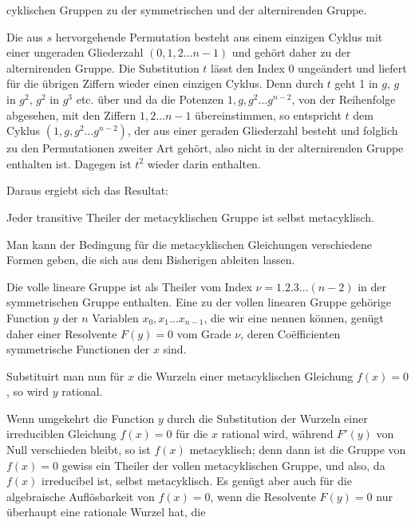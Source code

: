 cyklischen Gruppen zu der symmetrischen und der alternirenden Gruppe.

Die aus $s$ hervorgehende Permutation besteht aus einem einzigen Cyklus mit einer ungeraden Gliederzahl $(0, 1, 2 \ldots n-1)$ und gehört daher zu der alternirenden Gruppe. Die Substitution $t$ lässt den Index 0 ungeändert und liefert für die übrigen Ziffern wieder einen einzigen Cyklus. Denn durch $t$ geht 1 in $g$, $g$ in $g^2$, $g^2$ in $g^3$ etc. über und da die Potenzen $1, g, g^2 \ldots g^{n-2}$, von der Reihenfolge abgesehen, mit den Ziffern $1, 2 \ldots n-1$ übereinstimmen, so entspricht $t$ dem Cyklus $(1, g, g^2 \ldots g^{n-2})$, der aus einer geraden Gliederzahl besteht und folglich zu den Permutationen zweiter Art gehört, also nicht in der alternirenden Gruppe enthalten ist. Dagegen ist $t^2$ wieder darin enthalten.

Daraus ergiebt sich das Resultat:


Jeder transitive Theiler der metacyklischen Gruppe ist selbst metacyklisch.

Man kann der Bedingung für die metacyklischen Gleichungen verschiedene Formen geben, die sich aus dem Bisherigen ableiten lassen.

Die volle lineare Gruppe ist als Theiler vom Index $\nu = 1 . 2 . 3 \ldots (n-2)$ in der symmetrischen Gruppe enthalten. Eine zu der vollen linearen Gruppe gehörige Function $y$ der $n$ Variablen $x_0, x_1 \ldots x_{n-1}$, die wir eine  nennen können, genügt daher einer Resolvente $F(y)=0$ vom Grade $\nu$, deren Coëfficienten symmetrische Functionen der $x$ sind.

Substituirt man nun für $x$ die Wurzeln einer metacyklischen Gleichung $f(x)=0$, so wird $y$ rational.

Wenn umgekehrt die Function $y$ durch die Substitution der Wurzeln einer irreduciblen Gleichung $f(x)=0$ für die $x$ rational wird, während $F'(y)$ von Null verschieden bleibt, so ist $f(x)$ metacyklisch; denn dann ist die Gruppe von $f(x)=0$ gewiss ein Theiler der vollen metacyklischen Gruppe, und also, da $f(x)$ irreducibel ist, selbst metacyklisch. Es genügt aber auch für die algebraische Auflösbarkeit von $f(x)=0$, wenn die Resolvente $F(y)=0$ nur überhaupt eine rationale Wurzel hat, die
